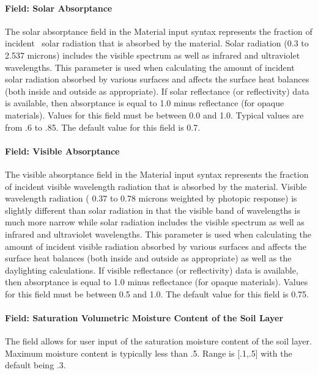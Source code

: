 \paragraph{Field: Solar Absorptance}\label{field-solar-absorptance-2}

The solar absorptance field in the Material input syntax represents the fraction of incident~ solar radiation that is absorbed by the material. Solar radiation (0.3 to 2.537 microns) includes the visible spectrum as well as infrared and ultraviolet wavelengths. This parameter is used when calculating the amount of incident solar radiation absorbed by various surfaces and affects the surface heat balances (both inside and outside as appropriate). If solar reflectance (or reflectivity) data is available, then absorptance is equal to 1.0 minus reflectance (for opaque materials). Values for this field must be between 0.0 and 1.0. Typical values are from .6 to .85. The default value for this field is 0.7.

\paragraph{Field: Visible Absorptance}\label{field-visible-absorptance-2}

The visible absorptance field in the Material input syntax represents the fraction of incident visible wavelength radiation that is absorbed by the material. Visible wavelength radiation ( 0.37 to 0.78 microns weighted by photopic response) is slightly different than solar radiation in that the visible band of wavelengths is much more narrow while solar radiation includes the visible spectrum as well as infrared and ultraviolet wavelengths. This parameter is used when calculating the amount of incident visible radiation absorbed by various surfaces and affects the surface heat balances (both inside and outside as appropriate) as well as the daylighting calculations. If visible reflectance (or reflectivity) data is available, then absorptance is equal to 1.0 minus reflectance (for opaque materials). Values for this field must be between 0.5 and 1.0. The default value for this field is 0.75.

\paragraph{Field: Saturation Volumetric Moisture Content of the Soil Layer}\label{field-saturation-volumetric-moisture-content-of-the-soil-layer}

The field allows for user input of the saturation moisture content of the soil layer. Maximum moisture content is typically less than .5. Range is {[}.1,.5{]} with the default being .3.

